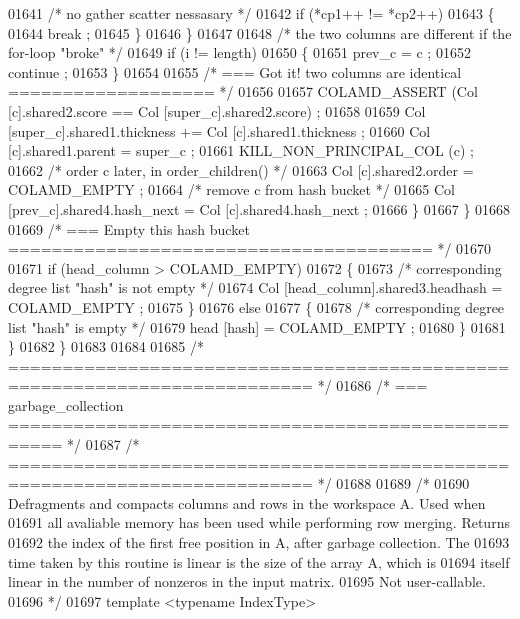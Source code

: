 \begin{DoxyCode}
{{{{{{{{{{{{{{{{{{{{{{{{{{{{01641       \textcolor{comment}{/* no gather scatter nessasary */}
01642       \textcolor{keywordflow}{if} (*cp1++ != *cp2++)
01643       \{
01644         break ;
01645       \}
01646     \}
01647 
01648     \textcolor{comment}{/* the two columns are different if the for-loop "broke" */}
01649     \textcolor{keywordflow}{if} (i != length)
01650     \{
01651       prev\_c = c ;
01652       continue ;
01653     \}
01654 
01655     \textcolor{comment}{/* === Got it!  two columns are identical =================== */}
01656 
01657     COLAMD\_ASSERT (Col [c].shared2.score == Col [super\_c].shared2.score) ;
01658 
01659     Col [super\_c].shared1.thickness += Col [c].shared1.thickness ;
01660     Col [c].shared1.parent = super\_c ;
01661     KILL\_NON\_PRINCIPAL\_COL (c) ;
01662     \textcolor{comment}{/* order c later, in order\_children() */}
01663     Col [c].shared2.order = COLAMD\_EMPTY ;
01664     \textcolor{comment}{/* remove c from hash bucket */}
01665     Col [prev\_c].shared4.hash\_next = Col [c].shared4.hash\_next ;
01666       \}
01667     \}
01668 
01669     \textcolor{comment}{/* === Empty this hash bucket ======================================= */}
01670 
01671     \textcolor{keywordflow}{if} (head\_column > COLAMD\_EMPTY)
01672     \{
01673       \textcolor{comment}{/* corresponding degree list "hash" is not empty */}
01674       Col [head\_column].shared3.headhash = COLAMD\_EMPTY ;
01675     \}
01676     \textcolor{keywordflow}{else}
01677     \{
01678       \textcolor{comment}{/* corresponding degree list "hash" is empty */}
01679       head [hash] = COLAMD\_EMPTY ;
01680     \}
01681   \}
01682 \}
01683 
01684 
01685 \textcolor{comment}{/* ========================================================================== */}
01686 \textcolor{comment}{/* === garbage\_collection =================================================== */}
01687 \textcolor{comment}{/* ========================================================================== */}
01688 
01689 \textcolor{comment}{/*}
01690 \textcolor{comment}{  Defragments and compacts columns and rows in the workspace A.  Used when}
01691 \textcolor{comment}{  all avaliable memory has been used while performing row merging.  Returns}
01692 \textcolor{comment}{  the index of the first free position in A, after garbage collection.  The}
01693 \textcolor{comment}{  time taken by this routine is linear is the size of the array A, which is}
01694 \textcolor{comment}{  itself linear in the number of nonzeros in the input matrix.}
01695 \textcolor{comment}{  Not user-callable.}
01696 \textcolor{comment}{*/}
01697 \textcolor{keyword}{template} <\textcolor{keyword}{typename} IndexType>
}}}}}}}}}}}}}}}}}}}}}}}}}}}}
\end{DoxyCode}
